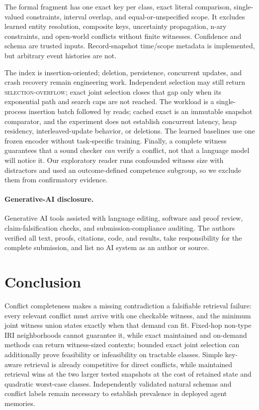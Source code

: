 \documentclass[letterpaper]{article} %
\begin{document}
The formal fragment has one exact key per class, exact literal comparison,
single-valued constraints, interval overlap, and equal-or-unspecified scope.
It excludes learned entity resolution, composite keys, uncertainty
propagation, n-ary constraints, and open-world conflicts without finite
witnesses.  Confidence and schema are trusted inputs.  Record-snapshot
time/scope metadata is implemented, but arbitrary event histories are not.

The index is insertion-oriented; deletion, persistence, concurrent updates,
and crash recovery remain engineering work.  Independent selection may still
return \textsc{selection-overflow}; exact joint selection closes that gap only
when its exponential path and search caps are not reached.  The workload is a
single-process insertion batch followed by reads; cached exact is an immutable
snapshot comparator, and the experiment does not establish concurrent
latency, heap residency, interleaved-update behavior, or deletions.
The learned baselines use one frozen encoder
without task-specific training.  Finally, a complete witness guarantees that
a sound checker \emph{can} verify a conflict, not that a language model will
notice it.  Our exploratory reader runs confounded witness size with
distractors and used an outcome-defined competence subgroup, so we exclude
them from confirmatory evidence.

\paragraph{Generative-AI disclosure.}
Generative AI tools assisted with language editing, software and proof review,
claim-falsification checks, and submission-compliance auditing.  The authors
verified all text, proofs, citations, code, and results, take responsibility
for the complete submission, and list no AI system as an author or source.

\section{Conclusion}

Conflict completeness makes a missing contradiction a falsifiable retrieval
failure: every relevant conflict must arrive with one checkable witness, and
the minimum joint witness union states exactly when that demand can fit.
Fixed-hop non-type IRI neighborhoods cannot guarantee it, while exact
maintained and on-demand methods can return witness-sized contexts; bounded exact joint
selection can additionally prove feasibility or infeasibility on tractable
classes.  Simple key-aware retrieval is already competitive for direct
conflicts, while maintained retrieval wins at the two larger tested snapshots
at the cost of retained state and quadratic worst-case classes.  Independently
validated natural schemas and conflict labels remain necessary to establish
prevalence in deployed agent memories.


\end{document}

